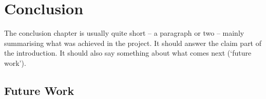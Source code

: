 \chapter{Conclusion}

The conclusion chapter is usually quite short – a paragraph or two – mainly summarising what was achieved in the project. It should answer the claim part of the introduction. It should also say something about what comes next (‘future work’).

\section{Future Work}